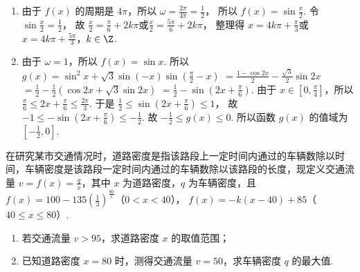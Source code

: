 \begin{solution}
\begin{enumerate}
\item 由于 \(f(x)\) 的周期是 \(4\pi\)，所以
\(\omega=\frac{2\pi}{4\pi}=\frac12\)，
所以
\(f(x)=\sin\frac{x}{2}\).
令
\(\sin\frac{x}{2}=\frac12\)，
故
\(\frac{x}{2}=\frac{\pi}{6}+2k\pi\)或\(\frac{x}{2}=\frac{5\pi}{6}+2k\pi\)，
整理得
\(x=4k\pi+\frac{\pi}{3}\)或\(x=4k\pi+\frac{5\pi}{3}\)，\(k\in\Z\).

\item 由于 \(\omega=1\)，所以 \(f(x)=\sin x\).
所以
\(g(x)=\sin^2x+\sqrt3\sin(-x)\sin\left(\frac\pi2-x\right)\)
\(=\frac{1-\cos2x}{2}-\frac{\sqrt3}{2}\sin2x\)
\(=\frac12-\frac12\left(\cos2x+\sqrt3\sin2x\right)\)
\(=\frac12-\sin\left(2x+\frac\pi6\right)\).
由于 \(x\in\left[0,\frac\pi4\right]\)，所以
\(\frac\pi6\le2x+\frac\pi6\le\frac{2\pi}{3}\).
于是
\(\frac12\le\sin\left(2x+\frac\pi6\right)\le1\)，
故
\(-1\le-\sin\left(2x+\frac\pi6\right)\le-\frac12\).
故
\(-\frac12\le g(x)\le0\).
所以函数 \(g(x)\) 的值域为 \(\left[-\frac12,0\right]\).
\end{enumerate}
\end{solution}

\begin{problem}
在研究某市交通情况时，道路密度是指该路段上一定时间内通过的车辆数除以时间，车辆密度是该路段一定时间内通过的车辆数除以该路段的长度，现定义交通流量 \(v=f(x)=\frac{q}{x}\)，其中 \(x\) 为道路密度，\(q\) 为车辆密度，且
\(f(x)=100-135\left(\frac13\right)^{\frac{80}{x}}\)（\(0<x<40\)），
\(f(x)=-k(x-40)+85\)（\(40\le x\le80\)）.

\begin{enumerate}
\item 若交通流量 \(v>95\)，求道路密度 \(x\) 的取值范围；
\item 已知道路密度 \(x=80\) 时，测得交通流量 \(v=50\)，求车辆密度 \(q\) 的最大值.
\end{enumerate}
\end{problem}

